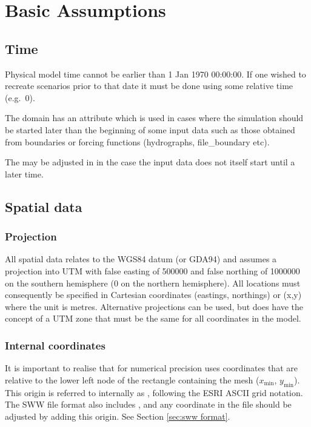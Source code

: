 \documentclass{manual}
\begin{document}


\chapter{Basic \anuga Assumptions}


\section{Time}

Physical model time cannot be earlier than 1 Jan 1970 00:00:00.
If one wished to recreate scenarios prior to that date it must be done
using some relative time (e.g.\ 0).

The \anuga domain has an attribute  which is used in cases where the
simulation should be started later than the beginning of some input data such as those
obtained from boundaries or forcing functions (hydrographs, file_boundary etc).

The  may be adjusted in  in the case the
input data does not itself start until a later time. 

 
\section{Spatial data}

\subsection{Projection}
All spatial data relates to the WGS84 datum (or GDA94) and assumes a projection
into UTM with false easting of 500000 and false northing of
1000000 on the southern hemisphere (0 on the northern hemisphere). 
All locations must consequently be specified in Cartesian coordinates
(eastings, northings) or (x,y) where the unit is metres.
Alternative projections can be used, but \anuga does have the concept of a UTM zone 
that must be the same for all coordinates in the model.

\subsection{Internal coordinates}
It is important to realise that for numerical precision \anuga uses coordinates that are relative 
to the lower left node of the rectangle containing the mesh ($x_{\mbox{min}}$, $y_{\mbox{min}}$). 
This origin is referred to internally as ,  following the ESRI ASCII grid notation.  
The SWW file format also includes ,  and any coordinate in the file should be adjusted 
by adding this origin. See Section \ref{sec:sww format}.
\end{document}
